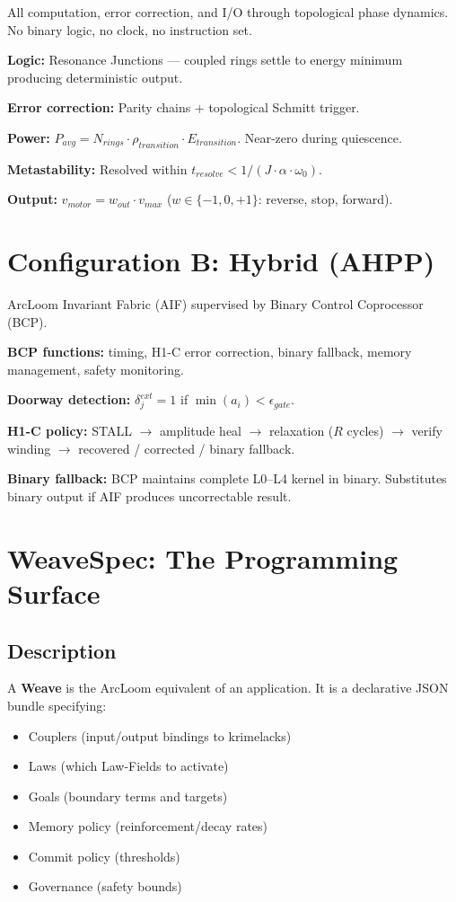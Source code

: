 \documentclass[11pt, a4paper]{report}
\begin{document}
All computation, error correction, and I/O through topological phase
dynamics. No binary logic, no clock, no instruction set.

\textbf{Logic:} Resonance Junctions --- coupled rings settle to energy
minimum producing deterministic output.

\textbf{Error correction:} Parity chains + topological Schmitt trigger.

\textbf{Power:} $P_{avg} = N_{rings} \cdot \rho_{transition} \cdot E_{transition}$.
Near-zero during quiescence.

\textbf{Metastability:} Resolved within $t_{resolve} < 1/(J \cdot \alpha \cdot \omega_0)$.

\textbf{Output:} $v_{motor} = w_{out} \cdot v_{max}$ ($w \in \{-1, 0, +1\}$:
reverse, stop, forward).

\chapter{Configuration B: Hybrid (AHPP)}

ArcLoom Invariant Fabric (AIF) supervised by Binary Control Coprocessor (BCP).

\textbf{BCP functions:} timing, H1-C error correction, binary fallback,
memory management, safety monitoring.

\textbf{Doorway detection:} $\delta_j^{ext} = 1$ if $\min(a_i) < \epsilon_{gate}$.

\textbf{H1-C policy:} STALL $\to$ amplitude heal $\to$ relaxation ($R$ cycles)
$\to$ verify winding $\to$ recovered / corrected / binary fallback.

\textbf{Binary fallback:} BCP maintains complete L0--L4 kernel in binary.
Substitutes binary output if AIF produces uncorrectable result.

\chapter{WeaveSpec: The Programming Surface}

\section{Description}

A \textbf{Weave} is the ArcLoom equivalent of an application. It is a
declarative JSON bundle specifying:
\begin{itemize}[nosep]
  \item Couplers (input/output bindings to krimelacks)
  \item Laws (which Law-Fields to activate)
  \item Goals (boundary terms and targets)
  \item Memory policy (reinforcement/decay rates)
  \item Commit policy (thresholds)
  \item Governance (safety bounds)
\end{itemize}
\end{document}
